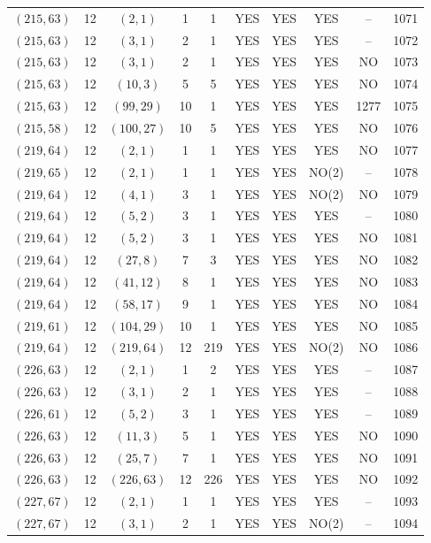 \begin{longtable}{|c|c|c|c|c|c|c|c|c|c|}
$(215, 63)$ & 12 & $(2, 1)$ & 1 & 1 & YES & YES & YES & -- & 1071\\
$(215, 63)$ & 12 & $(3, 1)$ & 2 & 1 & YES & YES & YES & -- & 1072\\
$(215, 63)$ & 12 & $(3, 1)$ & 2 & 1 & YES & YES & YES & NO & 1073\\
$(215, 63)$ & 12 & $(10, 3)$ & 5 & 5 & YES & YES & YES & NO & 1074\\
$(215, 63)$ & 12 & $(99, 29)$ & 10 & 1 & YES & YES & YES & 1277 & 1075\\
$(215, 58)$ & 12 & $(100, 27)$ & 10 & 5 & YES & YES & YES & NO & 1076\\
$(219, 64)$ & 12 & $(2, 1)$ & 1 & 1 & YES & YES & YES & NO & 1077\\
$(219, 65)$ & 12 & $(2, 1)$ & 1 & 1 & YES & YES & NO(2) & -- & 1078\\
$(219, 64)$ & 12 & $(4, 1)$ & 3 & 1 & YES & YES & NO(2) & NO & 1079\\
$(219, 64)$ & 12 & $(5, 2)$ & 3 & 1 & YES & YES & YES & -- & 1080\\
$(219, 64)$ & 12 & $(5, 2)$ & 3 & 1 & YES & YES & YES & NO & 1081\\
$(219, 64)$ & 12 & $(27, 8)$ & 7 & 3 & YES & YES & YES & NO & 1082\\
$(219, 64)$ & 12 & $(41, 12)$ & 8 & 1 & YES & YES & YES & NO & 1083\\
$(219, 64)$ & 12 & $(58, 17)$ & 9 & 1 & YES & YES & YES & NO & 1084\\
$(219, 61)$ & 12 & $(104, 29)$ & 10 & 1 & YES & YES & YES & NO & 1085\\
$(219, 64)$ & 12 & $(219, 64)$ & 12 & 219 & YES & YES & NO(2) & NO & 1086\\
$(226, 63)$ & 12 & $(2, 1)$ & 1 & 2 & YES & YES & YES & -- & 1087\\
$(226, 63)$ & 12 & $(3, 1)$ & 2 & 1 & YES & YES & YES & -- & 1088\\
$(226, 61)$ & 12 & $(5, 2)$ & 3 & 1 & YES & YES & YES & -- & 1089\\
$(226, 63)$ & 12 & $(11, 3)$ & 5 & 1 & YES & YES & YES & NO & 1090\\
$(226, 63)$ & 12 & $(25, 7)$ & 7 & 1 & YES & YES & YES & NO & 1091\\
$(226, 63)$ & 12 & $(226, 63)$ & 12 & 226 & YES & YES & YES & NO & 1092\\
$(227, 67)$ & 12 & $(2, 1)$ & 1 & 1 & YES & YES & YES & -- & 1093\\
$(227, 67)$ & 12 & $(3, 1)$ & 2 & 1 & YES & YES & NO(2) & -- & 1094\\

\end{longtable}
